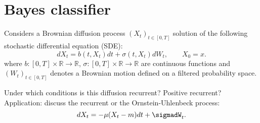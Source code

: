 \section{Bayes classifier}

\begin{tcolorbox}[width=\linewidth, sharp corners=all, colback=white!95!black]
    Considers a Brownian diffusion process $(X_t)_{t\in [0,T]}$ solution of the following stochastic differential equation (SDE):
    \begin{equation*}\label{SDE}
    dX_t=b(t, X_t)dt+\sigma(t,X_t)dW_t,\qquad X_0=x.
    \end{equation*}
    where $b:[0,T]\times \mathbb{R} \to \mathbb{R}$, $\sigma :[0,T]\times\mathbb{R}\to \mathbb{R}$ are continuous functions and $(W_t)_{t\in [0,T]}$ denotes a Brownian motion defined on a filtered probability space.\newline

    Under which conditions is this diffusion recurrent? Positive recurrent?\\

    Application: discuss the recurrent or the Ornstein-Uhlenbeck process:
    \begin{equation*}\label{OU}
        dX_t=-\mu(X_t - m) dt+\sigmadW_t.
    \end{equation*}

\end{tcolorbox}